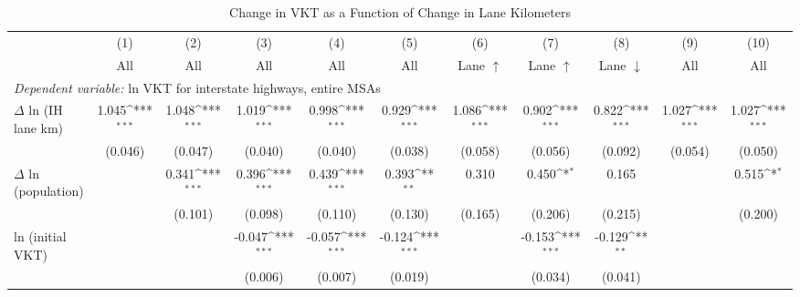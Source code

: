          \begin{table}[htbp]\centering         {}         \caption{Change in VKT as a Function of Change in Lane Kilometers}         \begin{tabular}{l*{10}{c}}         \hline\hline                 
                    &\multicolumn{1}{c}{(1)}&\multicolumn{1}{c}{(2)}&\multicolumn{1}{c}{(3)}&\multicolumn{1}{c}{(4)}&\multicolumn{1}{c}{(5)}&\multicolumn{1}{c}{(6)}&\multicolumn{1}{c}{(7)}&\multicolumn{1}{c}{(8)}&\multicolumn{1}{c}{(9)}&\multicolumn{1}{c}{(10)}\\
                    &\multicolumn{1}{c}{All}&\multicolumn{1}{c}{All}&\multicolumn{1}{c}{All}&\multicolumn{1}{c}{All}&\multicolumn{1}{c}{All}&\multicolumn{1}{c}{Lane $\uparrow$}&\multicolumn{1}{c}{Lane $\uparrow$}&\multicolumn{1}{c}{Lane $\downarrow$}&\multicolumn{1}{c}{All}&\multicolumn{1}{c}{All}\\
 \hline \multicolumn{10}{l}{ \emph{Dependent variable:} ln VKT for interstate highways, entire MSAs} \\ 
$\Delta$ ln (IH lane km)&       1.045\sym{***}&       1.048\sym{***}&       1.019\sym{***}&       0.998\sym{***}&       0.929\sym{***}&       1.086\sym{***}&       0.902\sym{***}&       0.822\sym{***}&       1.027\sym{***}&       1.027\sym{***}\\
                    &     (0.046)         &     (0.047)         &     (0.040)         &     (0.040)         &     (0.038)         &     (0.058)         &     (0.056)         &     (0.092)         &     (0.054)         &     (0.050)         \\
[1em]
$\Delta$ ln (population)&                     &       0.341\sym{***}&       0.396\sym{***}&       0.439\sym{***}&       0.393\sym{**} &       0.310         &       0.450\sym{*}  &       0.165         &                     &       0.515\sym{*}  \\
                    &                     &     (0.101)         &     (0.098)         &     (0.110)         &     (0.130)         &     (0.165)         &     (0.206)         &     (0.215)         &                     &     (0.200)         \\
[1em]
ln (initial VKT)    &                     &                     &      -0.047\sym{***}&      -0.057\sym{***}&      -0.124\sym{***}&                     &      -0.153\sym{***}&      -0.129\sym{**} &                     &                     \\
                    &                     &                     &     (0.006)         &     (0.007)         &     (0.019)         &                     &     (0.034)         &     (0.041)         &                     &                     \\

\end{tabular}
\end{table}
